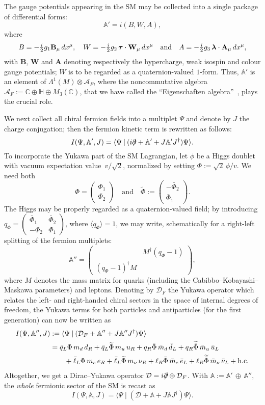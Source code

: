 \documentclass[a4paper,12pt]{article}
\newcommand{\A}{\mathcal{A}}        %
\renewcommand{\AA}{\mathbb{A}}      %
\newcommand{\C}{\mathbb{C}}         %
\newcommand{\D}{\mathcal{D}}        %
\newcommand{\delslash}{\partial\mkern-9mu/} %
\newcommand{\HH}{\mathbb{H}}        %
\newcommand{\La}{\Lambda}           %
\newcommand{\lab}{\boldsymbol{\lambda}} %
\newcommand{\Onda}[1]{\widetilde{#1}} %
\newcommand{\ox}{\otimes}           %
\newcommand{\sepword}[1]{\quad\text{#1}\quad} %
\newcommand{\stroke}{\mathbin\vert} %
\newcommand{\taub}{\boldsymbol{\tau}} %
\newcommand{\tihalf}{\tfrac{i}{2}}  %
\newcommand{\1}{\mathbf{1}}         %
\newcommand{\7}{\dagger}            %
\newcommand{\8}{\bullet}            %
\renewcommand{\.}{\cdot}            %
\renewcommand{\:}{\colon}           %
\def\<#1,#2>{\langle#1\stroke#2\rangle} %
\begin{document}
The gauge potentials appearing in the SM may be collected into a
single package of differential forms:
$$
\AA' = i(B,W,A),
$$
where
$$
B = -\tihalf g_1 \mathbf{B}_\mu \,dx^\mu, \quad
W = -\tihalf g_2\,\taub \cdot \mathbf{W}_\mu \,dx^\mu
\quad{\rm and}
\quad A = -\tihalf g_3\,\lab \cdot \mathbf{A}_\mu\,dx^\mu,
$$
with $\mathbf{B}$, $\mathbf{W}$ and $\mathbf{A}$ denoting respectively
the hypercharge, weak isospin and colour gauge potentials; $W$ is to
be regarded as a quaternion-valued $1$-form. Thus, $\AA'$ is an
element of $\La^1(M) \ox \A_F$, where the noncommutative algebra
$\A_F := \C \oplus \HH \oplus M_3(\C)$, that we have called the
``Eigenschaften algebra''~\cite{Cordelia}, plays the crucial role.

We next collect all chiral fermion fields into a multiplet $\Psi$ and
denote by $J$ the charge conjugation; then the fermion kinetic term is
rewritten as follows:
$$
I(\Psi,\AA',J) = \<\Psi, (i \delslash + \AA' + J\AA' J^\7) \Psi>.
$$
To incorporate the Yukawa part of the SM Lagrangian, let 
$\phi$ be a Higgs doublet with vacuum expectation value~$v/\sqrt2$, 
normalized by setting $\Phi := \sqrt2\,\phi/v$. We need both
$$
\Phi = \begin{pmatrix} \Phi_1\\ \Phi_2\end{pmatrix}
\sepword{and}
\Onda\Phi := \begin{pmatrix} -\bar\Phi_2 \\ \bar\Phi_1 \end{pmatrix}.
$$
The Higgs may be properly regarded as a quaternion-valued field; by
introducing $q_\Phi = \begin{pmatrix} \bar\Phi_1 & \bar\Phi_2 \\
- \Phi_2 & \Phi_1 \end{pmatrix}$, where
$\langle q_\Phi \rangle = 1$, we may write, schematically for a
right-left splitting of the fermion multiplets:
$$
\AA'' = \begin{pmatrix} & M^\7 (q_\Phi - 1) \\
(q_\Phi - 1)^\7 M & \end{pmatrix},
$$
where $M$ denotes the mass matrix for quarks (including the
Cabibbo--Kobayashi--Maskawa parameters) and leptons. Denoting by
$\D_F$ the Yukawa operator which relates the left- and right-handed
chiral sectors in the space of internal degrees of freedom, the Yukawa
terms for both particles and antiparticles (for the first generation)
can now be written as
\begin{align*}
I(\Psi,\AA'',J) &:= \<\Psi, (\D_F + \AA'' + J\AA''J^\7) \Psi>
\\
&= \bar q_L \Phi\,m_d\,d_R + \bar q_L \Onda\Phi\,m_u\,u_R
+ q_R \bar \Phi\,\bar m_d\, \bar d_L
+ q_R \Onda{\bar\Phi}\,\bar m_u\, \bar u_L
\\
&\qquad
+ \bar\ell_L \Phi\,m_e\,e_R
+ \bar\ell_L \Onda\Phi\,m_\nu\,\nu_R
+ \ell_R \bar\Phi\, \bar m_e\, \bar e_L 
+ \ell_R  \Onda{\bar\Phi}\,\bar m_\nu\, \bar \nu_L
+ {\rm h.c.}
\end{align*}
Altogether, we get a Dirac--Yukawa operator
$\D = i\delslash \oplus \D_F$. With $\AA := \AA'\,\oplus\,\AA''$, the
\textit{whole} fermionic sector of the SM is recast as
$$
I(\Psi,\AA,J) = \<\Psi, (\D + \AA + J\AA J^\7) \Psi>.
$$
\end{document}
